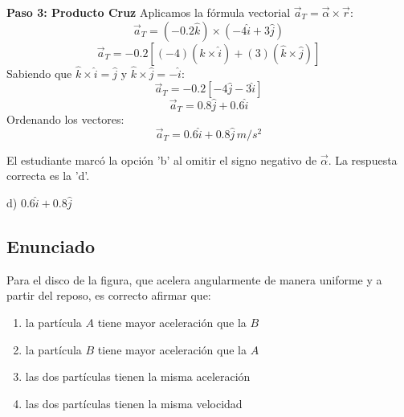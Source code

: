 \documentclass[12pt, a4paper]{article}
\begin{document}
\textbf{Paso 3: Producto Cruz}
Aplicamos la fórmula vectorial $\vec{a}_T = \vec{\alpha} \times \vec{r}$:
$$ \vec{a}_T = (-0.2\hat{k}) \times (-4\hat{i} + 3\hat{j}) $$
$$ \vec{a}_T = -0.2 \left[ (-4)(\hat{k} \times \hat{i}) + (3)(\hat{k} \times \hat{j}) \right] $$
Sabiendo que $\hat{k} \times \hat{i} = \hat{j}$ y $\hat{k} \times \hat{j} = -\hat{i}$:
$$ \vec{a}_T = -0.2 \left[ -4\hat{j} - 3\hat{i} \right] $$
$$ \vec{a}_T = 0.8\hat{j} + 0.6\hat{i} $$
Ordenando los vectores:
$$ \vec{a}_T = 0.6\hat{i} + 0.8\hat{j} \,\si{m/s^2} $$

El estudiante marcó la opción 'b' al omitir el signo negativo de $\vec{\alpha}$. La respuesta correcta es la 'd'.

\begin{tcolorbox}[colback=green!5!white, colframe=green!50!black, title=Respuesta Final]
\centering \Large d) $0.6\hat{i} + 0.8\hat{j}$
\end{tcolorbox}

\newpage

\subsection*{Enunciado}
Para el disco de la figura, que acelera angularmente de manera uniforme y a partir del reposo, es correcto afirmar que:

\begin{center}
\end{center}

\begin{enumerate}[label=\alph*)]
    \item la partícula $A$ tiene mayor aceleración que la $B$
    \item la partícula $B$ tiene mayor aceleración que la $A$
    \item las dos partículas tienen la misma aceleración
    \item las dos partículas tienen la misma velocidad
\end{enumerate}
\end{document}
